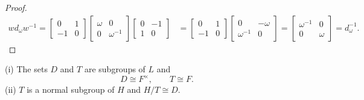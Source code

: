 \begin{proof}
\begin{align*}
w d_\omega w^{-1} = \begin{bmatrix} 0 & 1 \\ - 1 & 0 \end{bmatrix} \begin{bmatrix} \omega & 0 \\ 0 & \omega^{-1} \end{bmatrix} \begin{bmatrix} 0 & - 1 \\ 1 & 0 \end{bmatrix} &=  \begin{bmatrix} 0 & 1 \\ - 1 & 0 \end{bmatrix} \begin{bmatrix} 0 & - \omega \\ \omega^{-1} & 0 \end{bmatrix} \! = \! \begin{bmatrix} \omega^{-1} & 0 \\ 0 & \omega \end{bmatrix} \!= d^{-1}_\omega. \end{align*}
 
\end{proof}

\begin{lemma}\label{6.1b}
(i) The sets $D$ and $T$ are subgroups of $L$ and
\begin{equation*} D\cong F^\times, \qquad T \cong F. \end{equation*}
(ii) $T$ is a normal subgroup of $H$ and $H / T \cong D$.
\end{lemma}
\vspace{0mm}

